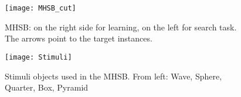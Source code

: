 \begin{figure}[H]
	\centering
	\begin{minipage}{0.49\textwidth}
		\centering
		\texttt{[image: MHSB\_cut]}
		\captionsetup{width=0.9\textwidth}
		\caption{MHSB: on the right side for learning, on the left for search task. The arrows point to the target instances.}
		\label{MHSBBOARDS}
	\end{minipage}
	\begin{minipage}{0.49\textwidth}
		\centering
		\texttt{[image: Stimuli]}
		\captionsetup{width=0.9\textwidth}
		\caption{Stimuli objects used in the MHSB. From left: Wave, Sphere, Quarter, Box, Pyramid}
		\label{Stimuli}
	\end{minipage}
\end{figure}


